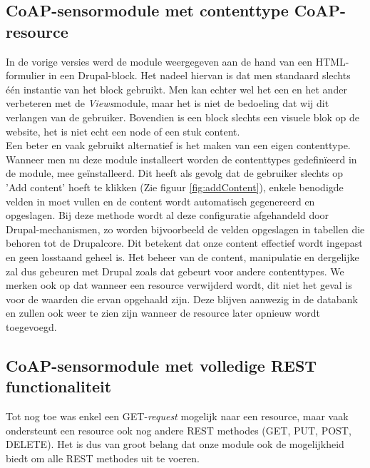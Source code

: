 \subsection{CoAP-sensormodule met contenttype CoAP-resource}
In de vorige versies werd de module weergegeven aan de hand van een HTML-formulier in een Drupal-block. Het nadeel hiervan is dat men standaard slechts \'{e}\'{e}n instantie van het block gebruikt. Men kan echter wel het een en het ander verbeteren met de \textit{Views}module, maar het is niet de bedoeling dat wij dit verlangen van de gebruiker. Bovendien is een block slechts een visuele blok op de website, het is niet echt een node of een stuk content.\\

Een beter en vaak gebruikt alternatief is het maken van een eigen contenttype. Wanneer men nu deze module installeert worden de contenttypes gedefin\"{i}eerd in de module, mee ge\"{i}nstalleerd. Dit heeft als gevolg dat de gebruiker slechts op 'Add content' hoeft te klikken (Zie figuur \ref{fig:addContent}), enkele benodigde velden in moet vullen en de content wordt automatisch gegenereerd en opgeslagen. Bij deze methode wordt al deze configuratie afgehandeld door Drupal-mechanismen, zo worden bijvoorbeeld de velden opgeslagen in tabellen die behoren tot de Drupalcore. Dit betekent dat onze content effectief wordt ingepast en geen losstaand geheel is. Het beheer van de content, manipulatie en dergelijke zal dus gebeuren met Drupal zoals dat gebeurt voor andere contenttypes. We merken ook op dat wanneer een resource verwijderd wordt, dit niet het geval is voor de waarden die ervan opgehaald zijn. Deze blijven aanwezig in de databank en zullen ook weer te zien zijn wanneer de resource later opnieuw wordt toegevoegd.\\

\subsection{CoAP-sensormodule met volledige REST functionaliteit} \label{rest}
Tot nog toe was enkel een GET-\textit{request} mogelijk naar een resource, maar vaak ondersteunt een resource ook nog andere REST methodes (GET, PUT, POST, DELETE). Het is dus van groot belang dat onze module ook de mogelijkheid biedt om alle REST methodes uit te voeren.\\


